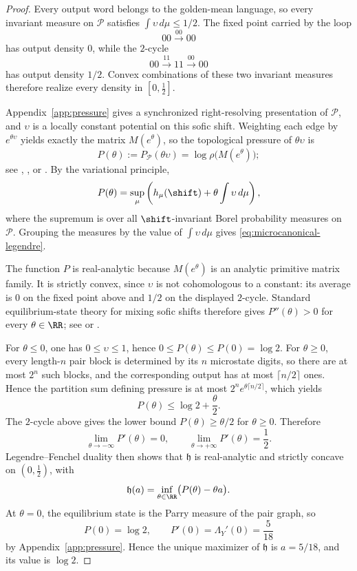 \begin{proof}
Every output word belongs to the golden-mean language, so every invariant measure on \(\mathcal P\) satisfies \(\int \upsilon\,d\mu\le 1/2\). The fixed point carried by the loop
\[
00\xrightarrow{00}00
\]
has output density \(0\), while the \(2\)-cycle
\[
00\xrightarrow{11}11\xrightarrow{00}00
\]
has output density \(1/2\). Convex combinations of these two invariant measures therefore realize every density in \([0,\frac12]\).

Appendix~\ref{app:pressure} gives a synchronized right-resolving presentation of \(\mathcal P\), and \(\upsilon\) is a locally constant potential on this sofic shift. Weighting each edge by \(e^{\theta\upsilon}\) yields exactly the matrix \(M(e^\theta)\), so the topological pressure of \(\theta\upsilon\) is
\[
P(\theta):=P_{\mathcal P}(\theta\upsilon)=\log \rho\!\bigl(M(e^\theta)\bigr);
\]
see \cite[Chapter~4]{ParryPollicott1990}, \cite[Chapter~9]{Walters1982}, or \cite[Chapter~6]{Ruelle2004}. By the variational principle,
\[
P(\theta)
=
\sup_{\mu}\left(h_\mu(\shift)+\theta\int \upsilon\,d\mu\right),
\]
where the supremum is over all \(\shift\)-invariant Borel probability measures on \(\mathcal P\). Grouping the measures by the value of \(\int \upsilon\,d\mu\) gives \eqref{eq:microcanonical-legendre}.

The function \(P\) is real-analytic because \(M(e^\theta)\) is an analytic primitive matrix family. It is strictly convex, since \(\upsilon\) is not cohomologous to a constant: its average is \(0\) on the fixed point above and \(1/2\) on the displayed \(2\)-cycle. Standard equilibrium-state theory for mixing sofic shifts therefore gives \(P''(\theta)>0\) for every \(\theta\in\RR\); see \cite[Chapter~4]{ParryPollicott1990} or \cite[Chapter~9]{Walters1982}.

For \(\theta\le 0\), one has \(0\le \upsilon\le 1\), hence \(0\le P(\theta)\le P(0)=\log 2\). For \(\theta\ge 0\), every length-\(n\) pair block is determined by its \(n\) microstate digits, so there are at most \(2^n\) such blocks, and the corresponding output has at most \(\lceil n/2\rceil\) ones. Hence the partition sum defining pressure is at most \(2^n e^{\theta\lceil n/2\rceil}\), which yields
\[
P(\theta)\le \log 2+\frac{\theta}{2}.
\]
The \(2\)-cycle above gives the lower bound \(P(\theta)\ge \theta/2\) for \(\theta\ge0\). Therefore
\[
\lim_{\theta\to-\infty}P'(\theta)=0,
\qquad
\lim_{\theta\to+\infty}P'(\theta)=\frac12.
\]
Legendre--Fenchel duality then shows that \(\mathfrak h\) is real-analytic and strictly concave on \((0,\frac12)\), with
\[
\mathfrak h(a)=\inf_{\theta\in\RR}\bigl(P(\theta)-\theta a\bigr).
\]
At \(\theta=0\), the equilibrium state is the Parry measure of the pair graph, so
\[
P(0)=\log 2,
\qquad
P'(0)=\Lambda_Y'(0)=\frac{5}{18}
\]
by Appendix~\ref{app:pressure}. Hence the unique maximizer of \(\mathfrak h\) is \(a=5/18\), and its value is \(\log 2\).


\end{proof}
